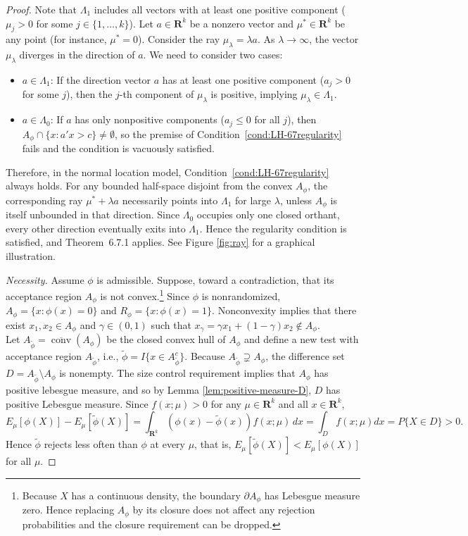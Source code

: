 \documentclass[12pt]{article}
\theoremstyle{definition}
\theoremstyle{remark}
\begin{document}
\begin{proof}
Note that $\Lambda_1$ includes all vectors with at least one positive component ($\mu_j > 0$ for some $j\in \{1,\dots,k\}$). Let $a \in \mathbf{R}^k$ be a nonzero vector and $\mu^* \in \mathbf{R}^k$ be any point (for instance, $\mu^* = 0$). Consider the ray $\mu_{\lambda} = \lambda a$. As $\lambda \to \infty$, the vector $\mu_{\lambda}$ diverges in the direction of $a$. We need to consider two cases: 
\begin{itemize}
    \item $a\in \Lambda_1$: If the direction vector $a$ has at least one positive component ($a_j > 0$ for some $j$), then the $j$-th component of $\mu_{\lambda}$ is positive, implying $\mu_{\lambda} \in \Lambda_1$.
    \item $a\in \Lambda_0$: If $a$ has only nonpositive components ($a_j \le 0$ for all $j$), then $A_\phi\cap\{x:a'x>c\}\ne \emptyset$, so the premise of Condition~\ref{cond:LH-67regularity} fails and the condition is vacuously satisfied.
\end{itemize}
Therefore, in the normal location model, Condition~\ref{cond:LH-67regularity} always holds. For any bounded half-space disjoint from the convex $A_\phi$, the corresponding ray $\mu^*+\lambda a$ necessarily points into $\Lambda_1$ for large $\lambda$, unless $A_\phi$ is itself unbounded in that direction. Since $\Lambda_0$ occupies only one closed orthant, every other direction eventually exits into $\Lambda_1$. Hence the regularity condition is satisfied, and Theorem~6.7.1 applies. See Figure \ref{fig:ray} for a graphical illustration. 

\noindent\emph{Necessity.}
Assume $\phi$ is admissible. Suppose, toward a contradiction, that its acceptance region $A_\phi$ is not convex.\footnote{Because $X$ has a continuous density, the boundary $\partial A_\phi$ has Lebesgue measure zero. Hence replacing $A_\phi$ by its closure does not affect any rejection probabilities and the closure requirement can be dropped.} Since $\phi$ is nonrandomized, $A_\phi = \{x : \phi(x) = 0\}$ and $R_\phi = \{x : \phi(x) = 1\}$. Nonconvexity implies that there exist $x_1,x_2 \in A_\phi$ and $\gamma \in (0,1)$ such that $x_\gamma = \gamma x_1 + (1-\gamma)x_2 \notin A_\phi$.\\

Let $A_{\tilde\phi} = \overline{\operatorname{conv}}(A_\phi)$ be the closed convex hull of $A_{\phi}$ and define a new test with acceptance region $A_{\tilde\phi}$, i.e., $\tilde\phi = I\{x\in A_{\tilde\phi}^c\}$. Because $A_{\tilde\phi} \supsetneq A_\phi$, the difference set $D = A_{\tilde\phi} \setminus A_\phi$ is nonempty. The size control requirement implies that $A_\phi$ has positive lebesgue measure, and so by Lemma \ref{lem:positive-measure-D}, $D$ has positive Lebesgue measure. Since $f(x;\mu)>0$ for any $\mu \in \mathbf{R}^k$ and all $x\in \mathbf R^k$,
\[
E_\mu[\phi(X)] - E_\mu[\tilde\phi(X)] 
= \int_{\mathbf{R}^k} (\phi(x)-\tilde\phi(x)) f(x;\mu)\,dx
= \int_{D} f(x;\mu)dx = P\{X\in D\} > 0.
\]
Hence $\tilde\phi$ rejects less often than $\phi$ at every $\mu$, that is, $E_\mu[\tilde\phi(X)] < E_\mu[\phi(X)]$ for all $\mu$.


\end{proof}
\end{document}
